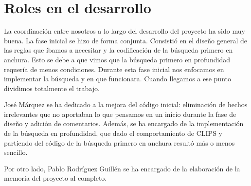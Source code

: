 \documentclass[11pt,a4paper,final]{article}
\begin{document}
\newpage

\section{Roles en el desarrollo}
La coordinación entre nosotros a lo largo del desarrollo del proyecto ha sido muy buena. La fase inicial se hizo de forma conjunta. Consistió en el diseño general de las reglas que íbamos a necesitar y la codificación de la búsqueda primero en anchura. Esto se debe a que vimos que la búsqueda primero en profundidad requería de menos condiciones. Durante esta fase inicial nos enfocamos en implementar la búsqueda y en que funcionara. Cuando llegamos a ese punto dividimos totalmente el trabajo. 

José Márquez se ha dedicado a la mejora del código inicial: eliminación de hechos irrelevantes que no aportaban lo que pensamos en un inicio durante la fase de diseño y adición de comentarios. Además, se ha encargado de la implementación de la búsqueda en profundidad, que dado el comportamiento de CLIPS y partiendo del código de la búsqueda primero en anchura resultó más o menos sencillo.

Por otro lado, Pablo Rodríguez Guillén se ha encargado de la elaboración de la memoria del proyecto al completo.

\clearpage



	
\end{document}
